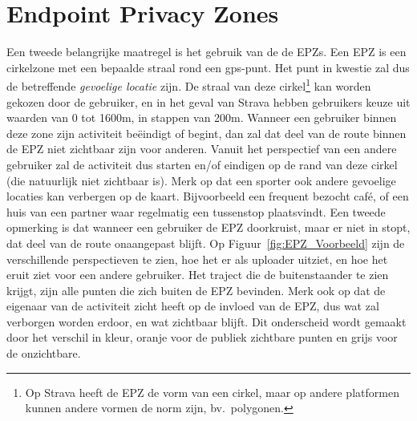 \section{Endpoint Privacy Zones}\label{EPZ}
Een tweede belangrijke maatregel is het gebruik van de de \acp{EPZ}. Een
\ac{EPZ} is een cirkelzone met een bepaalde straal rond een \ac{gps}-punt. Het
punt in kwestie zal dus de betreffende \textit{gevoelige locatie} zijn. De
straal van deze cirkel\footnote{Op Strava heeft de \ac{EPZ} de vorm van een
    cirkel, maar op andere platformen kunnen andere vormen de norm zijn, bv.\
    polygonen.} kan worden gekozen door de gebruiker, en in het geval van Strava
hebben gebruikers keuze uit waarden van 0 tot 1600m, in stappen van 200m.
Wanneer een gebruiker binnen deze zone zijn activiteit beëindigt of begint, dan
zal dat deel van de route binnen de \ac{EPZ} niet zichtbaar zijn voor anderen.
Vanuit het perspectief van een andere gebruiker zal de activiteit dus starten
en/of eindigen op de rand van deze cirkel (die natuurlijk niet zichtbaar is).
Merk op dat een sporter ook andere gevoelige locaties kan verbergen op de
kaart. Bijvoorbeeld een frequent bezocht café, of een huis van een partner waar
regelmatig een tussenstop plaatsvindt. Een tweede opmerking is dat wanneer een
gebruiker de \ac{EPZ} doorkruist, maar er niet in stopt, dat deel van de route
onaangepast blijft. Op Figuur~\ref{fig:EPZ_Voorbeeld} zijn de verschillende
perspectieven te zien, hoe het er als uploader uitziet, en hoe het eruit ziet
voor een andere gebruiker. Het traject die de buitenstaander te zien krijgt,
zijn alle punten die zich buiten de \ac{EPZ} bevinden. Merk ook op dat de
eigenaar van de activiteit zicht heeft op de invloed van de \ac{EPZ}, dus wat
zal verborgen worden erdoor, en wat zichtbaar blijft. Dit onderscheid wordt
gemaakt door het verschil in kleur, oranje voor de publiek zichtbare punten en
grijs voor de onzichtbare.
